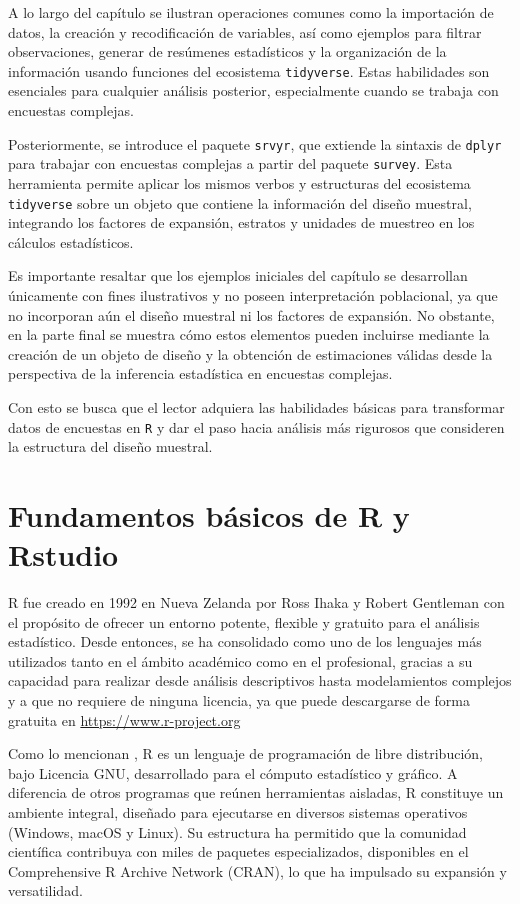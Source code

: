 \documentclass[
  spanish,
  12pt,
]{book}
\begin{document}
A lo largo del capítulo se ilustran operaciones comunes como la importación de datos, la creación y recodificación de variables, así como ejemplos para filtrar observaciones, generar de resúmenes estadísticos y la organización de la información usando funciones del ecosistema \texttt{tidyverse}. Estas habilidades son esenciales para cualquier análisis posterior, especialmente cuando se trabaja con encuestas complejas.

Posteriormente, se introduce el paquete \texttt{srvyr}, que extiende la sintaxis de \texttt{dplyr} para trabajar con encuestas complejas a partir del paquete \texttt{survey}. Esta herramienta permite aplicar los mismos verbos y estructuras del ecosistema \texttt{tidyverse} sobre un objeto que contiene la información del diseño muestral, integrando los factores de expansión, estratos y unidades de muestreo en los cálculos estadísticos.

Es importante resaltar que los ejemplos iniciales del capítulo se desarrollan únicamente con fines ilustrativos y no poseen interpretación poblacional, ya que no incorporan aún el diseño muestral ni los factores de expansión. No obstante, en la parte final se muestra cómo estos elementos pueden incluirse mediante la creación de un objeto de diseño y la obtención de estimaciones válidas desde la perspectiva de la inferencia estadística en encuestas complejas.

Con esto se busca que el lector adquiera las habilidades básicas para transformar datos de encuestas en \texttt{R} y dar el paso hacia análisis más rigurosos que consideren la estructura del diseño muestral.

\section{Fundamentos básicos de R y Rstudio}\label{fundamentos-buxe1sicos-de-r-y-rstudio}

R fue creado en 1992 en Nueva Zelanda por Ross Ihaka y Robert Gentleman con el propósito de ofrecer un entorno potente, flexible y gratuito para el análisis estadístico. Desde entonces, se ha consolidado como uno de los lenguajes más utilizados tanto en el ámbito académico como en el profesional, gracias a su capacidad para realizar desde análisis descriptivos hasta modelamientos complejos y a que no requiere de ninguna licencia, ya que puede descargarse de forma gratuita en \url{https://www.r-project.org}

Como lo mencionan \citet{santana2014arte}, R es un lenguaje de programación de libre distribución, bajo Licencia GNU, desarrollado para el cómputo estadístico y gráfico. A diferencia de otros programas que reúnen herramientas aisladas, R constituye un ambiente integral, diseñado para ejecutarse en diversos sistemas operativos (Windows, macOS y Linux). Su estructura ha permitido que la comunidad científica contribuya con miles de paquetes especializados, disponibles en el Comprehensive R Archive Network (CRAN), lo que ha impulsado su expansión y versatilidad.
\end{document}
